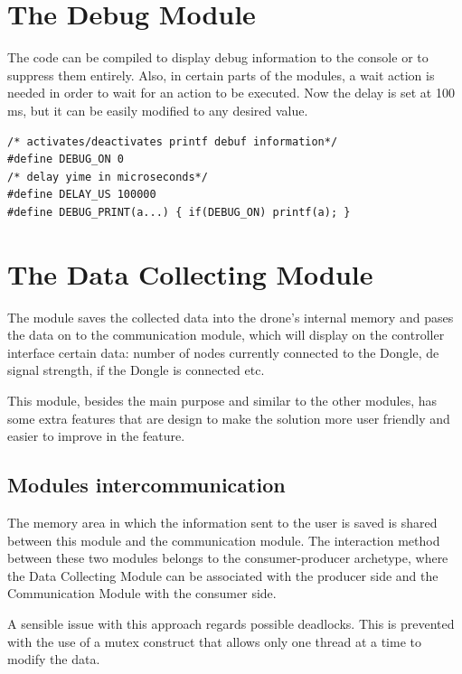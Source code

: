 \section{The Debug Module}

The code can be compiled to display debug information to the console or to suppress them entirely. Also, in certain parts of the modules, a wait action is needed in order to wait for an action to be executed. Now the delay is set at 100 ms, but it can be easily modified to any desired value.

\lstset{numbers=none, mathescape=true, nolol=false,caption=Data Collection use of mutex,label=lst:task}
\begin{lstlisting}
/* activates/deactivates printf debuf information*/
#define DEBUG_ON 0
/* delay yime in microseconds*/
#define DELAY_US 100000
#define DEBUG_PRINT(a...) { if(DEBUG_ON) printf(a); }
\end{lstlisting}


\section{The Data Collecting Module}

The module saves the collected data into the drone's internal memory and pases the data on to the communication module, which will display on the controller interface certain data: number of nodes currently connected to the Dongle, de signal strength, if the Dongle is connected etc.

This module, besides the main purpose and similar to the other modules, has some extra features that are design to make the solution more user friendly and easier to improve in the feature.

\subsection{Modules intercommunication}

The memory area in which the information sent to the user is saved is shared between this module and the communication module. The interaction method between these two modules belongs to the consumer-producer archetype, where the Data Collecting Module can be associated with the producer side and the Communication Module with the consumer side.

A sensible issue with this approach regards possible deadlocks. This is prevented with the use of a mutex construct that allows only one thread at a time to modify the data.

